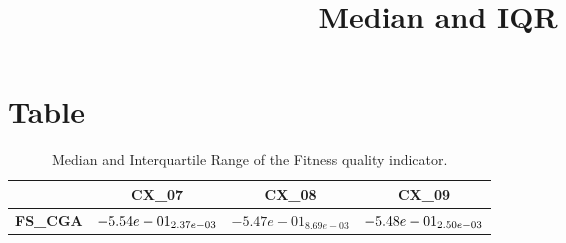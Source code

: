 \documentclass{article}
\title{Median and IQR}
\author{}
\begin{document}
\maketitle
\section{Table}
\begin{table}[!htp]
  \caption{Median and Interquartile Range of the Fitness quality indicator.}
  \label{table:Fitness}
  \centering
  \begin{scriptsize}
  \begin{tabular}{c|ccc}
      & \textbf{CX\_07} & \textbf{CX\_08} & \textbf{CX\_09} \\\hline
      \textbf{FS_CGA} & $\cellcolor{gray25} -5.54e-01_{2.37e-03} $ & $ -5.47e-01_{8.69e-03} $ & $ \cellcolor{gray95} -5.48e-01_{2.50e-03}$ \\
  \end{tabular}
  \end{scriptsize}
\end{table}
\end{document}
